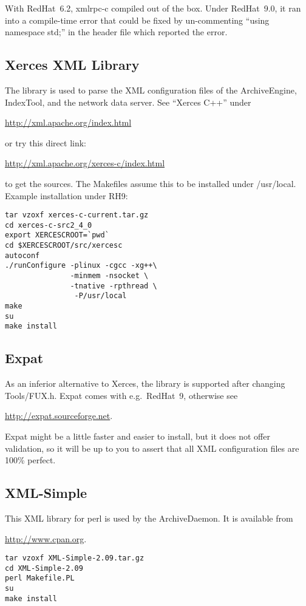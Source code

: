 With RedHat~6.2, xmlrpc-c compiled out of the box.
Under RedHat~9.0, it ran into a compile-time error that could be fixed
by un-commenting ``using namespace std;'' in the header file which
reported the error.

\subsection{Xerces XML Library}
The  library is used to parse the XML configuration files of the
ArchiveEngine, IndexTool, and the network data server.
See ``Xerces C++'' under
\begin{center}
\href{http://xml.apache.org/index.html}{http://xml.apache.org/index.html}
\end{center}
or try this direct link:
\begin{center}
\href{http://xml.apache.org/xerces-c/index.html}
     {http://xml.apache.org/xerces-c/index.html}
\end{center}
to get the sources. The Makefiles assume this to be installed under /usr/local.
Example installation under RH9:
\begin{lstlisting}[keywordstyle=\sffamily]
tar vzoxf xerces-c-current.tar.gz 
cd xerces-c-src2_4_0
export XERCESCROOT=`pwd`
cd $XERCESCROOT/src/xercesc
autoconf
./runConfigure -plinux -cgcc -xg++\
               -minmem -nsocket \
               -tnative -rpthread \
                -P/usr/local
make
su
make install
\end{lstlisting}

\subsection{Expat}
As an inferior alternative to Xerces, the  library is supported
after changing Tools/FUX.h. Expat comes with e.g.\ RedHat~9,
otherwise see
\begin{center}
\href{http://expat.sourceforge.net}{http://expat.sourceforge.net}.
\end{center}
Expat might be a little faster and easier to install, but it does not
offer validation, so it will be up to you to assert that all XML
configuration files are 100\% perfect.

\subsection{XML-Simple}
This XML library for perl is used by the ArchiveDaemon.
It is available from 
\begin{center}
\href{http://www.cpan.org}{http://www.cpan.org}.
\end{center}
\begin{lstlisting}[keywordstyle=\sffamily]
tar vzoxf XML-Simple-2.09.tar.gz
cd XML-Simple-2.09
perl Makefile.PL
su
make install
\end{lstlisting}


